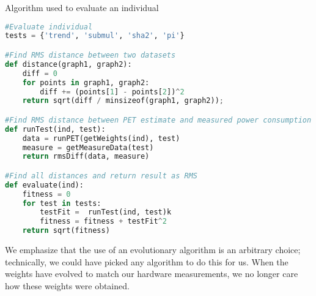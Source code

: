\begin{algorithm}
\caption{Algorithm used to evaluate an individual}
\label{lst:ga-eval-algorithm}
\begin{lstlisting}[language=python,style=algo]
#Evaluate individual
tests = {'trend', 'submul', 'sha2', 'pi'}

#Find RMS distance between two datasets
def distance(graph1, graph2):
    diff = 0
    for points in graph1, graph2:
        diff += (points[1] - points[2])^2
    return sqrt(diff / minsizeof(graph1, graph2));

#Find RMS distance between PET estimate and measured power consumption
def runTest(ind, test):
    data = runPET(getWeights(ind), test)
    measure = getMeasureData(test)
    return rmsDiff(data, measure)

#Find all distances and return result as RMS
def evaluate(ind):
    fitness = 0
    for test in tests:
        testFit =  runTest(ind, test)k
        fitness = fitness + testFit^2
    return sqrt(fitness)
\end{lstlisting}
\end{algorithm}




We emphasize that the use of an evolutionary algorithm is an arbitrary choice;
technically, we could have picked any algorithm to do this for us. When the
weights have evolved to match our hardware measurements, we no longer care how
these weights were obtained.
